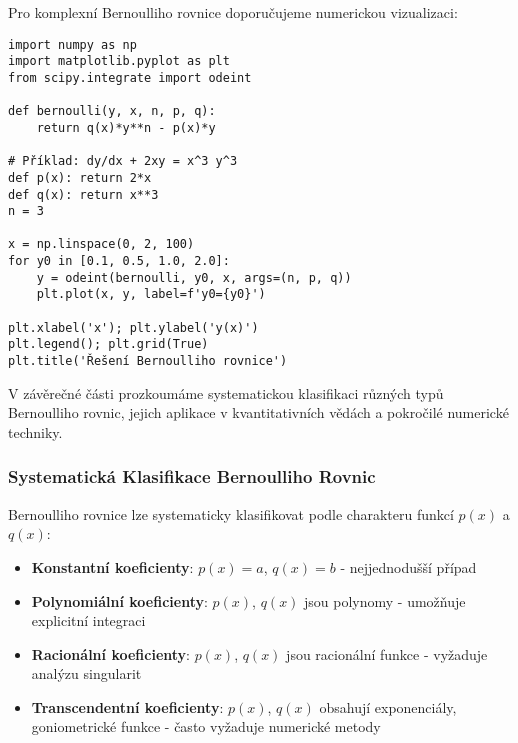 \vspace{0.8\baselineskip}

\begin{remark}
\label{rem:numericka-vizualizace}
Pro komplexní Bernoulliho rovnice doporučujeme numerickou vizualizaci:

\begin{verbatim}
import numpy as np
import matplotlib.pyplot as plt
from scipy.integrate import odeint

def bernoulli(y, x, n, p, q):
    return q(x)*y**n - p(x)*y

# Příklad: dy/dx + 2xy = x^3 y^3
def p(x): return 2*x
def q(x): return x**3
n = 3

x = np.linspace(0, 2, 100)
for y0 in [0.1, 0.5, 1.0, 2.0]:
    y = odeint(bernoulli, y0, x, args=(n, p, q))
    plt.plot(x, y, label=f'y0={y0}')

plt.xlabel('x'); plt.ylabel('y(x)')
plt.legend(); plt.grid(True)
plt.title('Řešení Bernoulliho rovnice')
\end{verbatim}
\end{remark}

\vspace{0.8\baselineskip}

\begin{transition}
V závěrečné části prozkoumáme systematickou klasifikaci různých typů Bernoulliho rovnic, jejich aplikace v kvantitativních vědách a pokročilé numerické techniky.
\end{transition}

\subsubsection{Systematická Klasifikace Bernoulliho Rovnic}
\label{subsubsec:systematicka-klasifikace}

\begin{classification}
\label{class:klasifikace-koeficienty}
Bernoulliho rovnice lze systematicky klasifikovat podle charakteru funkcí $p(x)$ a $q(x)$:

\begin{itemize}
\item \textbf{Konstantní koeficienty}: $p(x) = a$, $q(x) = b$ - nejjednodušší případ
\item \textbf{Polynomiální koeficienty}: $p(x)$, $q(x)$ jsou polynomy - umožňuje explicitní integraci
\item \textbf{Racionální koeficienty}: $p(x)$, $q(x)$ jsou racionální funkce - vyžaduje analýzu singularit
\item \textbf{Transcendentní koeficienty}: $p(x)$, $q(x)$ obsahují exponenciály, goniometrické funkce - často vyžaduje numerické metody
\end{itemize}
\end{classification}

